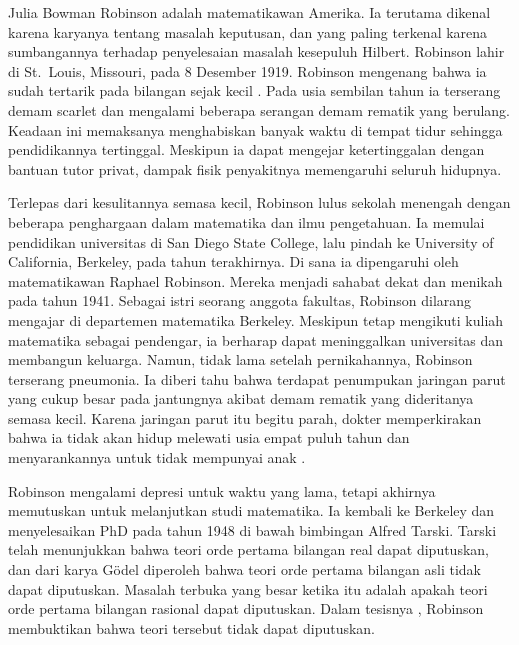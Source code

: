 \documentclass[../../../include/open-logic-section]{subfiles}
\begin{document}



Julia Bowman Robinson adalah matematikawan Amerika. Ia terutama dikenal
karena karyanya tentang masalah keputusan, dan yang paling terkenal karena
sumbangannya terhadap penyelesaian masalah kesepuluh Hilbert. Robinson lahir
di St.~Louis, Missouri, pada 8 Desember 1919. Robinson mengenang bahwa ia
sudah tertarik pada bilangan sejak kecil \citep[4]{Reid1986}. Pada usia
sembilan tahun ia terserang demam scarlet dan mengalami beberapa serangan
demam rematik yang berulang. Keadaan ini memaksanya menghabiskan banyak waktu
di tempat tidur sehingga pendidikannya tertinggal. Meskipun ia dapat mengejar
ketertinggalan dengan bantuan tutor privat, dampak fisik penyakitnya
memengaruhi seluruh hidupnya.

Terlepas dari kesulitannya semasa kecil, Robinson lulus sekolah menengah
dengan beberapa penghargaan dalam matematika dan ilmu pengetahuan. Ia
memulai pendidikan universitas di San Diego State College, lalu pindah ke
University of California, Berkeley, pada tahun terakhirnya. Di sana ia
dipengaruhi oleh matematikawan Raphael Robinson. Mereka menjadi sahabat
dekat dan menikah pada tahun 1941. Sebagai istri seorang anggota fakultas,
Robinson dilarang mengajar di departemen matematika Berkeley. Meskipun tetap
mengikuti kuliah matematika sebagai pendengar, ia berharap dapat
meninggalkan universitas dan membangun keluarga. Namun, tidak lama setelah
pernikahannya, Robinson terserang pneumonia. Ia diberi tahu bahwa terdapat
penumpukan jaringan parut yang cukup besar pada jantungnya akibat demam
rematik yang dideritanya semasa kecil. Karena jaringan parut itu begitu
parah, dokter memperkirakan bahwa ia tidak akan hidup melewati usia empat
puluh tahun dan menyarankannya untuk tidak mempunyai anak
\citep[13]{Reid1986}.

Robinson mengalami depresi untuk waktu yang lama, tetapi akhirnya memutuskan
untuk melanjutkan studi matematika. Ia kembali ke Berkeley dan menyelesaikan
PhD pada tahun 1948 di bawah bimbingan Alfred Tarski. Tarski telah
menunjukkan bahwa teori orde pertama bilangan real dapat diputuskan, dan
dari karya G\"odel diperoleh bahwa teori orde pertama bilangan asli tidak
dapat diputuskan. Masalah terbuka yang besar ketika itu adalah apakah teori
orde pertama bilangan rasional dapat diputuskan. Dalam tesisnya
\citeyearpar{Robinson1949}, Robinson membuktikan bahwa teori tersebut tidak
dapat diputuskan.
\end{document}
